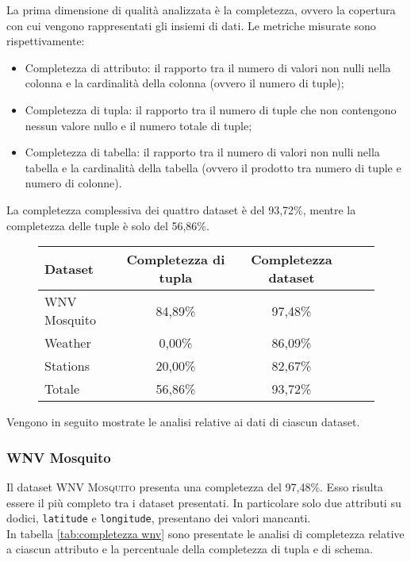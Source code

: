 La prima dimensione di qualità analizzata è la completezza, ovvero la copertura 
con cui vengono rappresentati gli insiemi di dati. Le metriche misurate sono 
rispettivamente:
\begin{itemize}
	\item Completezza di attributo: il rapporto tra il numero di valori non
	nulli nella colonna e la cardinalità della colonna (ovvero il numero di 
	tuple);
	\item Completezza di tupla: il rapporto tra il numero di tuple che non 
	contengono nessun valore nullo e il numero totale di tuple;
	\item Completezza di tabella: il rapporto tra il numero di valori non nulli 
	nella tabella e la cardinalità della tabella (ovvero il prodotto tra numero 
	di tuple e numero di colonne).
\end{itemize}


La completezza complessiva dei quattro dataset è del 93,72\%, mentre la 
completezza delle tuple è solo del 56,86\%.

\begin{figure}[H]
	\centering
	\begin{tabular}{lcccc}
		\toprule
		\textbf{Dataset} \quad & \textbf{Completezza di tupla} & \textbf{Completezza dataset} \\
		\midrule
		WNV Mosquito &		84,89\%  	& 97,48\%  \\ 
		Weather 	 &		 0,00\% 	& 86,09\%  \\ 
		Stations 	 &		20,00\% 	& 82,67\%  \\ 
		\midrule
		Totale 		 &	    56,86\%     & 93,72\%  \\
		\bottomrule
	\end{tabular}
	\label{tab:completezza totale}
\end{figure}

Vengono in seguito mostrate le analisi relative ai dati di ciascun dataset.

\subsubsection*{WNV Mosquito}
Il dataset \textsc{WNV Mosquito} presenta una completezza del 97,48\%. Esso risulta essere il più completo tra i dataset presentati. In particolare solo due attributi su dodici, \texttt{latitude} e \texttt{longitude}, presentano dei valori mancanti.\\
In tabella \ref{tab:completezza wnv} sono presentate le analisi di completezza relative a ciascun attributo e la percentuale della completezza di tupla e di schema.

